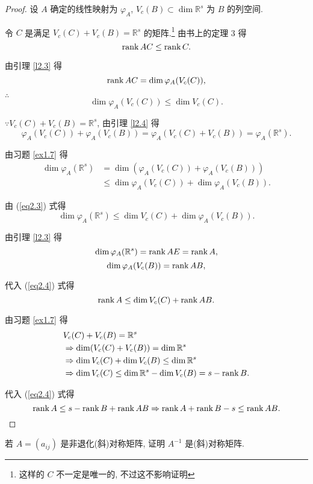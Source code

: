 \documentclass[color=black,device=normal,lang=cn,mode=geye]{elegantnote}
\begin{document}
\begin{proof}
    设 $A$ 确定的线性映射为 $\varphi_A$, $V_c(B)\subset\dim\mathbb{R}^s$ 为 $B$ 的列空间.

    令 $C$ 是满足 $V_c(C)+V_c(B)=\mathbb{R}^s$ 的矩阵.\footnote{这样的 $C$ 不一定是唯一的, 不过这不影响证明} 由书上的定理 3 得
    \[\operatorname{rank} AC\leq\operatorname{rank} C.\]

    由引理 \ref{l2.3} 得
    \[\operatorname{rank} AC=\dim\varphi_A(V_c(C)),\]

    $\therefore$
    \begin{equation}\label{eq2.3}
        \dim\varphi_A(V_c(C))\leq\dim V_c(C).
    \end{equation}

    $\because V_c(C)+V_c(B)=\mathbb{R}^s$, 由引理 \ref{l2.4} 得
    \[\varphi_A(V_c(C))+\varphi_A(V_c(B))=\varphi_A(V_c(C)+V_c(B))=\varphi_A(\mathbb{R}^s).\]

    由习题 \ref{ex1.7} 得
    \begin{align*}
        \dim\varphi_A(\mathbb{R}^s) & =\dim(\varphi_A(V_c(C))+\varphi_A(V_c(B))) \\
        & \leq\dim\varphi_A(V_c(C))+\dim\varphi_A(V_c(B)).
    \end{align*}

    由 (\ref{eq2.3}) 式得
    \begin{equation}\label{eq2.4}
        \dim\varphi_A(\mathbb{R}^s)\leq\dim V_c(C)+\dim\varphi_A(V_c(B)).
    \end{equation}

    由引理 \ref{l2.3} 得
    \[\dim\varphi_A(\mathbb{R}^s)=\operatorname{rank} AE=\operatorname{rank} A,\]
    \[\dim\varphi_A(V_c(B))=\operatorname{rank} AB,\]

    代入 (\ref{eq2.4}) 式得
    \[\operatorname{rank} A\leq\dim V_c(C)+\operatorname{rank} AB.\]

    由习题 \ref{ex1.7} 得
    \begin{align*}
        & V_c(C)+V_c(B)=\mathbb{R}^s \\
        & \Rightarrow\dim (V_c(C)+V_c(B))=\dim\mathbb{R}^s \\
        & \Rightarrow\dim V_c(C)+\dim V_c(B)\leq\dim\mathbb{R}^s \\
        & \Rightarrow\dim V_c(C)\leq\dim\mathbb{R}^s-\dim V_c(B)=s-\operatorname{rank} B.
    \end{align*}

    代入 (\ref{eq2.4}) 式得
    \[\operatorname{rank} A\leq s-\operatorname{rank} B+\operatorname{rank} AB\Rightarrow\operatorname{rank} A+\operatorname{rank} B-s\leq\operatorname{rank} AB.\qedhere\]
\end{proof}
\setcounter{exercise}{10}
\begin{exercise}[有修改]
    若 $A=(a_{ij})$ 是非退化(斜)对称矩阵, 证明 $A^{-1}$ 是(斜)对称矩阵.
\end{exercise}
\end{document}
